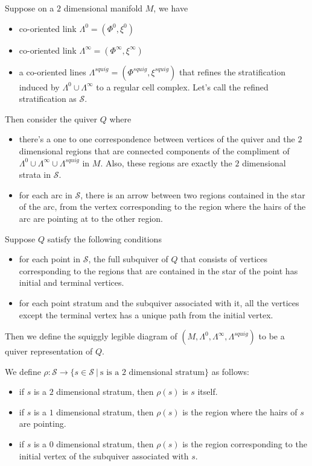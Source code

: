 \begin{definition}
Suppose on a $2$ dimensional manifold $M$, we have 
\begin{itemize}
\item co-oriented link $\Lambda^0 = (\Phi^0,\xi^0)$

\item co-oriented link $\Lambda^\infty = (\Phi^\infty,\xi^\infty)$

\item a co-oriented lines $\Lambda^{squig} = (\Phi^{squig}, \xi^{squig})$ that refines the stratification induced by $\Lambda^0 \cup \Lambda^\infty$ to a regular cell complex. Let's call the refined stratification as $\mathcal{S}$.
\end{itemize}
Then consider the quiver $Q$ where
\begin{itemize}
\item there's a one to one correspondence between vertices of the quiver and the $2$ dimensional regions that are connected components of the compliment of $\Lambda^0 \cup \Lambda^\infty \cup \Lambda^{squig}$ in $M$. Also, these regions are exactly the $2$ dimensional strata in $\mathcal{S}$.

\item for each arc in $\mathcal{S}$, there is an arrow between two regions contained in the star of the arc, from the vertex corresponding to the region where the hairs of the arc are pointing at to the other region.
\end{itemize}
Suppose $Q$ satisfy the following conditions
\begin{itemize}
\item for each point in $\mathcal{S}$, the full subquiver of $Q$ that consists of vertices corresponding to the regions that are contained in the star of the point has initial and terminal vertices.

\item for each point stratum and the subquiver associated with it, all the vertices except the terminal vertex has a unique path from the initial vertex.
\end{itemize}
Then we define the squiggly legible diagram of $(M,\Lambda^0,\Lambda^\infty,\Lambda^{squig})$ to be a quiver representation of $Q$.
\end{definition}
\begin{definition}
We define $\rho:\mathcal{S}\rightarrow \{s \in \mathcal{S} ~|~ \text{s is a 2 dimensional stratum}\}$ as follows:
\begin{itemize}
\item if $s$ is a $2$ dimensional stratum, then $\rho(s)$ is $s$ itself.

\item if $s$ is a $1$ dimensional stratum, then $\rho(s)$ is the region where the hairs of $s$ are pointing.

\item if $s$ is a $0$ dimensional stratum, then $\rho(s)$ is the region corresponding to the initial vertex of the subquiver associated with $s$.
\end{itemize}
\end{definition}
